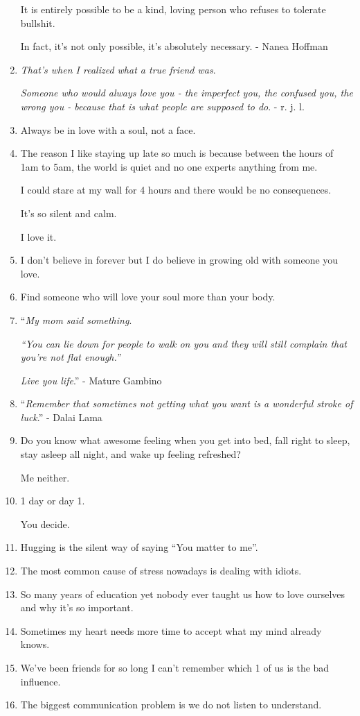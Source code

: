\documentclass{article}
\begin{document}
\begin{enumerate}
	It is entirely possible to be a kind, loving person who refuses to tolerate bullshit.
	
	In fact, it's not only possible, it's absolutely necessary. - Nanea Hoffman
	\item \textit{That's when I realized what a true friend was}.
	
	\textit{Someone who would always love you - the imperfect you, the confused you, the wrong you - because that is what people are supposed to do}. - r. j. l.
	\item Always be in love with a soul, not a face.
	\item The reason I like staying up late so much is because between the hours of 1am to 5am, the world is quiet and no one experts anything from me.
	
	I could stare at my wall for 4 hours and there would be no consequences.
	
	It's so silent and calm.
	
	I love it.
	\item I don't believe in forever but I do believe in growing old with someone you love.
	\item Find someone who will love your soul more than your body.
	\item ``\textit{My mom said something}.
	
	\textit{``You can lie down for people to walk on you and they will still complain that you're not flat enough.''}
	
	\textit{Live you life}.'' - Mature Gambino
	\item ``\textit{Remember that sometimes not getting what you want is a wonderful stroke of luck}.'' - Dalai Lama
	\item Do you know what awesome feeling when you get into bed, fall right to sleep, stay asleep all night, and wake up feeling refreshed?
	
	Me neither.
	\item 1 day or day 1.
	
	You decide.
	\item Hugging is the silent way of saying ``You matter to me''.
	\item The most common cause of stress nowadays is dealing with idiots.
	\item So many years of education yet nobody ever taught us how to love ourselves and why it's so important.
	\item Sometimes my heart needs more time to accept what my mind already knows.
	\item We've been friends for so long I can't remember which 1 of us is the bad influence.
	\item The biggest communication problem is we do not listen to understand.
	

\end{enumerate}
\end{document}
